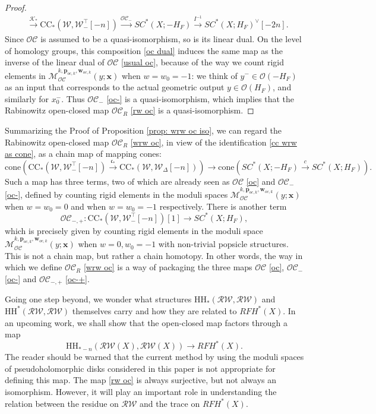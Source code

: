\documentclass[11pt]{amsproc}
\def\w{\mathcal{W}(E)}
\def\o{\mathcal{O}}
\def\oc{\mathcal{OC}}
\def\r#1{\mathrm{#1}}
\def\w{\mathcal{W}}
\def\rw{\mathcal{RW}}
\def\D{\Delta}
\def\M{\mathcal{M}}
\def\cone{\mathrm{cone}}
\def\ck{\mathfrak{c}}
\theoremstyle{remark}
\numberwithin{equation}{section}
\begin{document}
\begin{proof}
\begin{equation}
\begin{split}
& \stackrel{\mathcal{K}_{*}}\to \r{CC}_{*}(\w, \w_{-}^{\top}[-n]) \stackrel{\oc_{-}}\to SC^{*}(X; -H_{F}) \stackrel{I^{-1}}\to SC^{*}(X; H_{F})^{\vee}[-2n].
\end{split}
\end{equation}
Since $\oc$ is assumed to be a quasi-isomorphism, so is its linear dual.
On the level of homology groups, 
this composition \eqref{oc dual} induces the same map as the inverse of the linear dual of $\oc$ \eqref{usual oc},
because of the way we count rigid elements in $\M_{\oc}^{k, \mathbf{p}_{oc, k}, \mathbf{w}_{oc, k}}(y; \mathbf{x})$ when $w=w_{0}=-1$:
we think of $y^{-} \in \o(-H_{F})$ as an input that corresponds to the actual geometric output $y \in \o(H_{F})$,
and similarly for $x_{0}^{-}$.
Thus $\oc_{-}$ \eqref{oc-} is a quasi-isomorphism,
which implies that the Rabinowitz open-closed map $\oc_{R}$ \eqref{rw oc} is a quasi-isomorphism.
\end{proof}

Summarizing the Proof of Proposition \ref{prop: wrw oc iso},
we can regard the Rabinowitz open-closed map $\oc_{R}$ \eqref{wrw oc}, 
in view of the identification \eqref{cc wrw as cone},
as a chain map of mapping cones:
\begin{equation}
\cone(\r{CC}_{*}(\w, \w_{-}^{\top}[-n]) \stackrel{\ck_{*}}\to \r{CC}_{*}(\w, \w_{\D}[-n])) \to \cone(SC^{*}(X; -H_{F}) \stackrel{c}\to SC^{*}(X; H_{F})).
\end{equation}
Such a map has three terms, two of which are already seen as $\oc$ \eqref{oc} and $\oc_{-}$ \eqref{oc-},
defined by counting rigid elements in the moduli spaces $\M_{\oc}^{k, \mathbf{p}_{oc, k}, \mathbf{w}_{oc, k}}(y; \mathbf{x})$ when $w=w_{0}=0$ and when $w=w_{0}=-1$ respectively.
There is another term
\begin{equation}\label{oc-+}
\oc_{-,+}: \r{CC}_{*}(\w, \w_{-}^{\top}[-n])[1] \to SC^{*}(X; H_{F}),
\end{equation}
which is precisely given by counting rigid elements in the moduli space $\M_{\oc}^{k, \mathbf{p}_{oc, k}, \mathbf{w}_{oc, k}}(y; \mathbf{x})$ when $w=0, w_{0}=-1$ with non-trivial popsicle structures.
This is not a chain map, but rather a chain homotopy.
In other words, the way in which we define $\oc_{R}$ \eqref{wrw oc} is a way of packaging the three maps $\oc$ \eqref{oc}, $\oc_{-}$ \eqref{oc-} and $\oc_{-, +}$ \eqref{oc-+}.

Going one step beyond, we wonder what structures $\r{HH}_{*}(\rw, \rw)$ and $\r{HH}^{*}(\rw, \rw)$ themselves carry and how they are related to $RFH^{*}(X)$.
In an upcoming work, we shall show that the open-closed map factors through a map
\begin{equation} \label{rw oc}
\r{HH}_{*-n}(\rw(X), \rw(X)) \to RFH^{*}(X).
\end{equation}
The reader should be warned that the current method by using the moduli spaces of pseudoholomorphic disks considered in this paper is not appropriate for defining this map.
The map \eqref{rw oc} is always surjective, but not always an isomorphism.
However, it will play an important role in understanding the relation between the residue on $\rw$ and the trace on $RFH^{*}(X)$.
\end{document}
